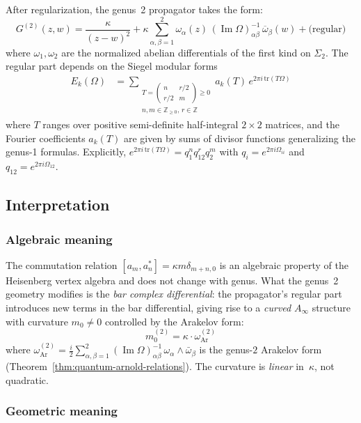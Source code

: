 After regularization, the genus~2 propagator takes the form:
\[
G^{(2)}(z,w) = \frac{\kappa}{(z-w)^2}
+ \kappa \sum_{\alpha,\beta=1}^{2} \omega_\alpha(z)\,(\operatorname{Im}\Omega)^{-1}_{\alpha\beta}\,
\overline{\omega}_\beta(w) + \text{(regular)}
\]
where $\omega_1, \omega_2$ are the normalized abelian differentials of the first kind on $\Sigma_2$.
The regular part depends on the Siegel modular forms
\begin{align}
E_k(\Omega) &= \sum_{\substack{T = \left(\begin{smallmatrix} n & r/2 \\ r/2 & m \end{smallmatrix}\right) \geq 0 \\ n, m \in \mathbb{Z}_{\geq 0},\, r \in \mathbb{Z}}} a_k(T)\, e^{2\pi i \,\mathrm{tr}(T \Omega)}
\end{align}
where $T$ ranges over positive semi-definite half-integral $2 \times 2$ matrices, and the Fourier coefficients $a_k(T)$ are given by sums of divisor functions generalizing the genus-1 formulas. Explicitly, $e^{2\pi i\,\mathrm{tr}(T\Omega)} = q_1^n q_{12}^r q_2^m$ with $q_i = e^{2\pi i \Omega_{ii}}$ and $q_{12} = e^{2\pi i \Omega_{12}}$.

\subsection{Interpretation}

\subsubsection{Algebraic meaning}

The commutation relation $[a_m, a^*_n] = \kappa m \delta_{m+n,0}$ is an algebraic property
of the Heisenberg vertex algebra and does not change with genus. What the genus~2
geometry modifies is the \emph{bar complex differential}: the propagator's regular part
introduces new terms in the bar differential, giving rise to a \emph{curved}
$A_\infty$ structure with curvature $m_0 \neq 0$ controlled by the Arakelov form:
\[m_0^{(2)} = \kappa \cdot \omega_{\mathrm{Ar}}^{(2)}\]
where $\omega_{\mathrm{Ar}}^{(2)} = \frac{i}{2}\sum_{\alpha,\beta=1}^{2}(\operatorname{Im}\Omega)^{-1}_{\alpha\beta}\,\omega_\alpha\wedge\bar\omega_\beta$ is the genus-$2$ Arakelov form
(Theorem~\ref{thm:quantum-arnold-relations}).
The curvature is \emph{linear} in~$\kappa$, not quadratic.

\subsubsection{Geometric meaning}

